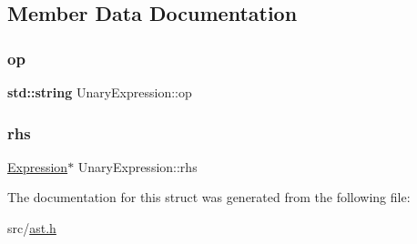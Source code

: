 \subsection{Member Data Documentation}
\mbox{\label{struct_unary_expression_a057cfd54844d5b36e15f16ee5272b071}} 
\subsubsection{\texorpdfstring{op}{op}}
{\footnotesize\ttfamily \textbf{ std\+::string} Unary\+Expression\+::op}

\mbox{\label{struct_unary_expression_a53e53c6c0a0b76c46cb49a1fa48be5a5}} 
\subsubsection{\texorpdfstring{rhs}{rhs}}
{\footnotesize\ttfamily \hyperlink{struct_expression}{Expression}$\ast$ Unary\+Expression\+::rhs}



The documentation for this struct was generated from the following file\+:\begin{DoxyCompactItemize}
\item 
src/\hyperlink{ast_8h}{ast.\+h}\end{DoxyCompactItemize}
